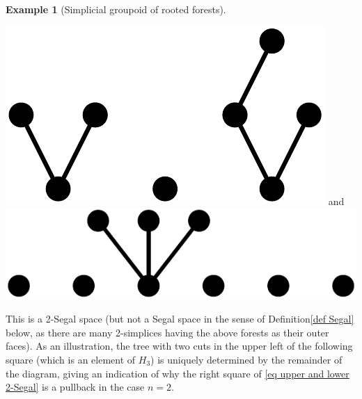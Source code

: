 \documentclass{amsart}
\theoremstyle{definition}
\newtheorem{example}[theorem]{Example}
\theoremstyle{remark}
\begin{document}
\begin{example}[Simplicial groupoid of rooted forests]
\begin{center}
\includegraphics[scale=0.2]{forest_cut_0.pdf} \qquad and \qquad \includegraphics[scale=0.2]{forest_cut_2.pdf} 
\end{center}
This is a 2-Segal space (but not a Segal space in the sense of Definition\nobreakspace \ref {def Segal} below, as there are many 2-simplices having the above forests as their outer faces).
As an illustration, the tree with two cuts in the upper left of the following square (which is an element of $H_3$) is uniquely determined by the remainder of the diagram, giving an indication of why the right square of \eqref{eq upper and lower 2-Segal} is a pullback in the case $n=2$.
\begin{center}
\end{center}
\end{example}
\end{document}
